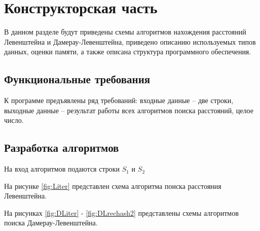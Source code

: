 \chapter{Конструкторская часть}

В данном разделе будут приведены схемы алгоритмов нахождения расстояний Левенштейна и Дамерау-Левенштейна, приведено описанию используемых типов данных, оценки памяти, а также описана структура программного обеспечения.

\section {Функциональные требования}

К программе предъявлены ряд требований: входные данные -- две строки, выходные данные -- результат работы всех алгоритмов поиска расстояний, целое число.

\section{Разработка алгоритмов}

На вход алгоритмов подаются строки $S_1$ и $S_2$

На рисунке \ref{fig:Liter} представлен схема алгоритма поиска расстояния Левенштейна.

На рисунках \ref{fig:DLiter} - \ref{fig:DLrechash2} представлены схемы алгоритмов поиска Дамерау-Левенштейна.

